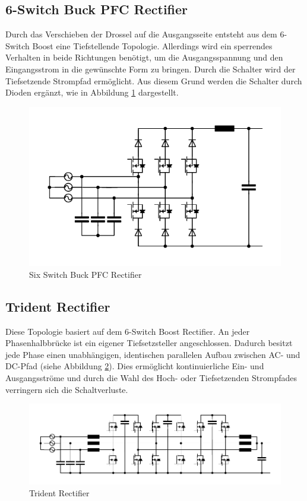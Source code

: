 	\subsection{6-Switch Buck PFC Rectifier}
		\label{sec:6switchBuck}
		Durch das Verschieben der Drossel auf die Ausgangsseite entsteht aus dem 6-Switch Boost eine Tiefstellende Topologie. Allerdings wird ein sperrendes Verhalten in beide Richtungen benötigt, um die Ausgangsspannung und den Eingangsstrom in die gewünschte Form zu bringen. Durch die Schalter wird der Tiefsetzende Strompfad ermöglicht. Aus diesem Grund werden die Schalter durch Dioden ergänzt, wie in Abbildung \ref{fig:sixswitchbuck} dargestellt.  
		
		\begin{figure}
			\centering
			\includegraphics[width=1\linewidth]{content/Grafiken/SixSwitchBuck}
			\caption{Six Switch Buck PFC Rectifier}
			\label{fig:sixswitchbuck}
		\end{figure}
		
		\subsection{Trident Rectifier}
		Diese Topologie basiert auf dem 6-Switch Boost Rectifier. An jeder Phasenhalbbrücke ist ein eigener Tiefsetzsteller angeschlossen. Dadurch besitzt jede Phase einen unabhängigen, identischen parallelen Aufbau zwischen AC- und DC-Pfad (siehe Abbildung \ref{fig:trident}). Dies ermöglicht kontinuierliche Ein- und Ausgangsströme und durch die Wahl des Hoch- oder Tiefsetzenden Strompfades verringern sich die Schaltverluste.
		\begin{figure}
			\centering
			\includegraphics[width=1\linewidth]{content/Grafiken/Trident}
			\caption{Trident Rectifier}
			\label{fig:trident}
		\end{figure}
		
